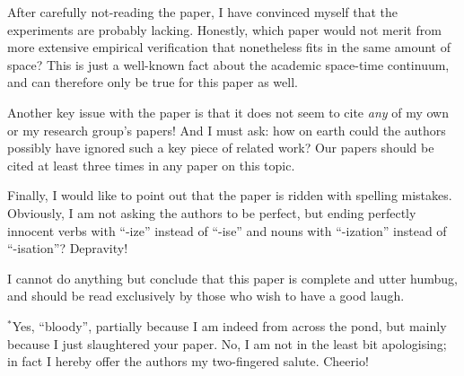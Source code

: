 \documentclass[12pt]{sigbovik-review}
\author{Reviewer Number Two-and-a-half}
\begin{document}
\maketitle

After carefully not-reading the paper, I have convinced myself that the experiments are probably lacking. Honestly, which paper would not merit from more extensive empirical verification that nonetheless fits in the same amount of space? This is just a well-known fact about the academic space-time continuum, and can therefore only be true for this paper as well.  

Another key issue with the paper is that it does not seem to cite \emph{any} of my own or my research group's papers! And I must ask: how on earth could the authors possibly have ignored such a key piece of related work? Our papers should be cited at least three times in any paper on this topic. 

Finally, I would like to point out that the paper is ridden with spelling mistakes. Obviously, I am not asking the authors to be perfect, but ending perfectly innocent verbs with ``-ize'' instead of ``-ise'' and nouns with ``-ization'' instead of ``-isation''? Depravity!

I cannot do anything but conclude that this paper is complete and utter humbug, and should be read exclusively by those who wish to have a good laugh. 

\vfill
$^*${\small Yes, ``bloody'', partially because I am indeed from across the pond, but mainly because I just slaughtered your paper. No, I am not in the least bit apologising; in fact I hereby offer the authors my two-fingered salute. Cheerio!}
\end{document}
